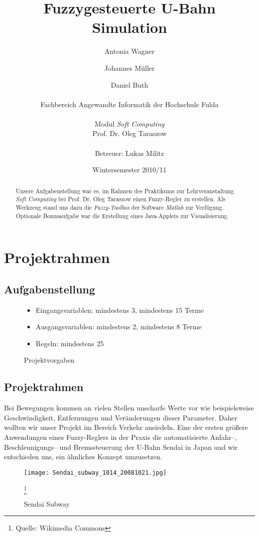 \documentclass[10pt,a4paper]{article}
\author{Antonia Wagner \and Johannes Müller \and Daniel Buth\\ \\
Fachbereich Angewandte Informatik der Hochschule Fulda\\ \\
Modul \textit{Soft Computing}\\
Prof. Dr. Oleg Taraszow\\ \\
Betreuer: Lukas Militz
}
\title{Fuzzygesteuerte U-Bahn Simulation}
\date{Wintersemester 2010/11}
\begin{document}
\maketitle
\tableofcontents

\section{Projektrahmen}
\subsection{Aufgabenstellung}
\begin{abstract}
Unsere Aufgabenstellung war es, im Rahmen des Praktikums zur Lehrveranstaltung \textit{Soft Computing} bei Prof. Dr. Oleg Taraszow einen Fuzzy-Regler zu erstellen.
Als Werkzeug stand uns dazu die \textit{Fuzzy-Toolbox} der Software \textit{Matlab} zur Verfügung.
Optionale Bonusaufgabe war die Erstellung eines Java-Applets zur Visualisierung.
\end{abstract}

\begin{figure}[htb]
\begin{itemize}
	\item Eingangsvariablen: mindestens 3, mindestens 15 Terme
	\item Ausgangsvariablen: mindestens 2, mindestens 8 Terme
	\item Regeln: mindestens 25
\end{itemize}
\caption{Projektvorgaben}
\label{projektvorgaben}
\end{figure}

\subsection{Projektrahmen}
Bei Bewegungen kommen an vielen Stellen unscharfe Werte vor wie beispielsweise Geschwindigkeit, Entfernungen und Veränderungen dieser Parameter. Daher wollten wir unser Projekt im Bereich Verkehr ansiedeln.
Eine der ersten größere Anwendungen eines Fuzzy-Reglers in der Praxis die automatisierte Anfahr--, Beschleunigungs-- und Bremssteuerung der U-Bahn Sendai in Japan und wir entschieden uns, ein ähnliches Konzept umzusetzen.

\begin{figure}[htb]
\begin{center}
\leavevmode
\texttt{[image: Sendai\_subway\_1014\_20081021.jpg]}
\caption[Sendai Subway]{Sendai Subway}
\label{Sendai Subway}
\footnote{Quelle: Wikimedia Commons}
\end{center}
\end{figure}
\end{document}
